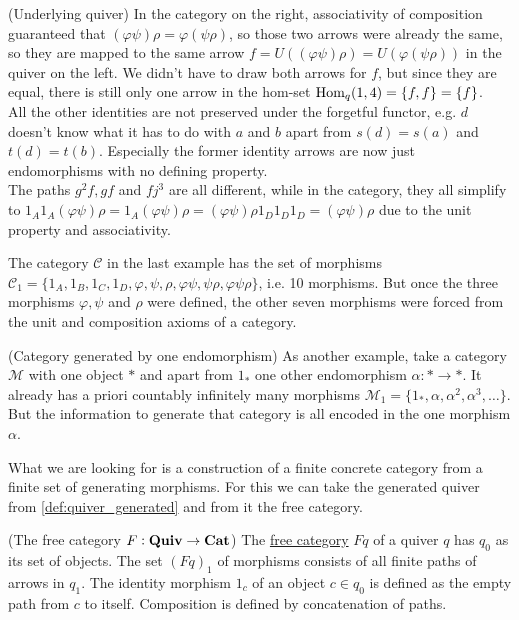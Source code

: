 \begin{example}{(Underlying quiver)}
\noindent In the category on the right, associativity of composition guaranteed that $(\varphi\psi)\rho = \varphi(\psi\rho)$, so those two arrows
were already the same, so they are mapped to the same arrow $f = U((\varphi\psi)\rho) = U(\varphi(\psi\rho))$ in the quiver on the left.
We didn't have to draw both arrows for $f$, but since they are equal, there is still only one arrow in the hom-set $\textup{Hom}_{q}(1,4)=\{f,f\} = \{f\}$.\\
All the other identities are not preserved under the forgetful functor, e.g. $d$ doesn't know what it has to do with $a$ and $b$ apart from
$s(d) = s(a)$ and $t(d) = t(b)$. Especially the former identity arrows are now just endomorphisms with no defining property.\\
The paths $g^{2}f, gf$ and $fj^{3}$ are all different, while in the category, they all simplify to
$1_{A}1_{A}(\varphi\psi)\rho = 1_{A}(\varphi\psi)\rho = (\varphi\psi)\rho1_{D}1_{D}1_{D} =  (\varphi\psi)\rho$ due to the unit property and associativity.
\end{example}

The category $\mathcal{C}$ in the last example has the set of morphisms $\mathcal{C}_{1} =
\{ 1_{A}, 1_{B}, 1_{C}, 1_{D}, \varphi, \psi, \rho, \varphi\psi, \psi\rho, \varphi\psi\rho \}$, i.e. 10 morphisms. But once the three morphisms
$\varphi, \psi$ and $\rho$ were defined, the other seven morphisms were forced from the unit and composition axioms of a category.

\begin{example}{(Category generated by one endomorphism)}\label{ex:category_generated_by_one_endomorphism}
As another example, take a category $\mathcal{M}$ with one object $\ast$ and apart from $1_{\ast}$ one other endomorphism
$\alpha : \ast \rightarrow \ast$. It already has a priori countably infinitely many morphisms
$\mathcal{M}_{1} = \{ 1_{\ast}, \alpha, \alpha^{2}, \alpha^{3}, \dots \}$. But the information to generate that category is all encoded in the
one morphism $\alpha$.
\end{example}

What we are looking for is a construction of a finite concrete category from a finite set of generating morphisms. For this we can take
the generated quiver from \ref{def:quiver_generated} and from it the free category.

\begin{definition}{(The free category $F : \mathrm{\textbf{Quiv}} \rightarrow \mathrm{\textbf{Cat}}$)}\label{def:free_category}
The \ul{free category} $Fq$ of a quiver $q$ has $q_{0}$ as its set of objects. The set $(Fq)_{1}$ of morphisms consists of all finite paths of arrows in
$q_{1}$. The identity morphism $1_{c}$ of an object $c \in q_{0}$ is defined as the empty path from $c$ to itself. Composition is defined by
concatenation of paths.
\end{definition}

